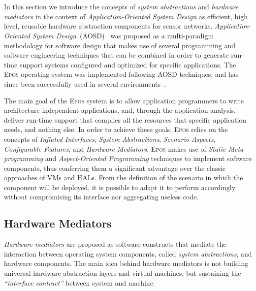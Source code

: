 
\section{\aosd}

In this section we introduce the concepts of \emph{system
abstractions} and \emph{hardware mediators} in the context of
\emph{Application-Oriented System Design} as efficient, high level,
reusable hardware abstraction components for sensor networks.
\emph{Application-Oriented System Design}~(AOSD)~\cite{Froehlich:2001}
was proposed as a multi-paradigm methodology for software design that
makes use of several programming and software engineering techniques
that can be combined in order to generate run-time support systems
configured and optimized for specific applications. The \textsc{Epos}
operating system was implemented following AOSD techniques, and has
since been successfully used in several
environments~\cite{Froehlich:HPCN:2000,Polpeta:EUC:2004}.

The main goal of the \textsc{Epos} system is to allow application
programmers to write architecture-independent applications, and, through
the application analysis, deliver run-time support that complies all the
resources that specific application needs, and nothing else.  
In order to achieve these goals, \textsc{Epos} relies on
the concepts of \emph{Inflated Interfaces}, \emph{System Abstractions}, 
\emph{Scenario Aspects}, \emph{Configurable Features}, 
and \emph{Hardware Mediators}.
\textsc{Epos} makes  use of \emph{Static Meta programming} and 
\emph{Aspect-Oriented Programming} techniques to implement software 
components, thus conferring them a
significant advantage over the classic approaches of VMs and HALs.
From the definition of the scenario in which the component will be
deployed, it is possible to adapt it to perform accordingly without
compromising its interface nor aggregating useless code.

\subsection{Hardware Mediators}



\emph{Hardware mediators} are proposed as
software constructs that mediate the interaction between operating
system components, called \emph{system abstractions}, and hardware
components.  The main idea behind hardware mediators is not building
universal hardware abstraction layers and virtual machines, but
sustaining the \emph{``interface contract''} between system and
machine.

